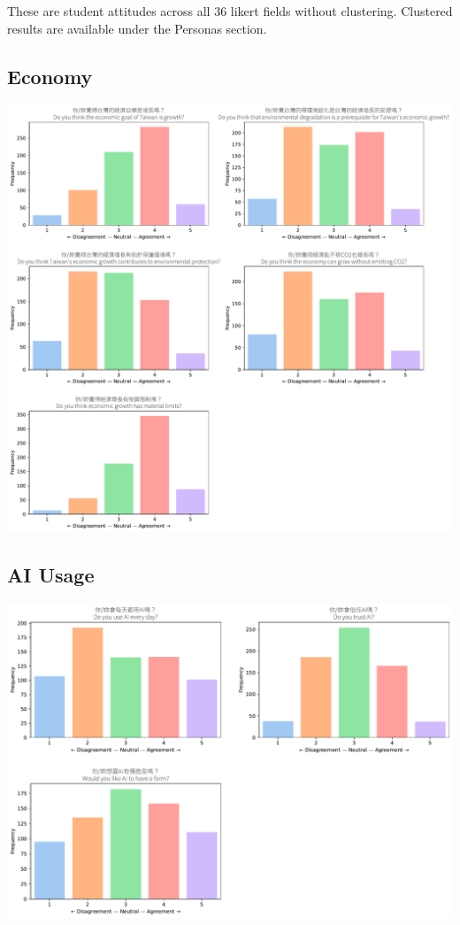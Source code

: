 \documentclass[
  letterpaper,
  DIV=11,
  numbers=noendperiod]{scrartcl}
\begin{document}
These are student attitudes across all 36 likert fields without
clustering. Clustered results are available under the Personas section.

\subsection{Economy}\label{economy}

\includegraphics{_thesis_files/figure-pdf/cell-66-output-1.pdf}

\subsection{AI Usage}\label{ai-usage}

\includegraphics{_thesis_files/figure-pdf/cell-67-output-1.pdf}
\end{document}
